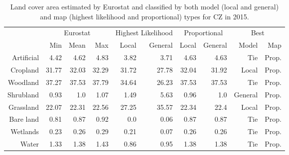     \begin{table}[H]
    \centering
    \caption{Land cover area estimated by Eurostat and classified by both model (local and general) and map (highest likelihood and proportional) types for CZ in 2015.}
    
    \begin{tabular}{r|rrr|rr|rr|rr}
    \toprule
    {} & \multicolumn{3}{|c}{Eurostat} & \multicolumn{2}{|c}{Highest Likelihood} & \multicolumn{2}{|c}{Proportional} & \multicolumn{2}{|c}{Best} \\
    {} &      Min &   Mean &    Max &              Local & General &        Local & General &    Model &    Map \\
    \midrule
    Artificial &     4.42 &   4.62 &   4.83 &               3.82 &    3.71 &         4.63 &    4.63 &      Tie &  Prop. \\
    Cropland   &    31.77 &  32.03 &  32.29 &              31.72 &   27.78 &        32.04 &   31.92 &    Local &  Prop. \\
    Woodland   &    37.27 &  37.53 &  37.79 &              34.64 &   26.23 &        37.53 &   37.53 &      Tie &  Prop. \\
    Shrubland  &     0.93 &    1.0 &   1.07 &               1.49 &    5.63 &         0.96 &     1.0 &  General &  Prop. \\
    Grassland  &    22.07 &  22.31 &  22.56 &              27.25 &   35.57 &        22.34 &    22.4 &    Local &  Prop. \\
    Bare land  &     0.81 &   0.87 &   0.92 &                0.0 &    0.06 &         0.87 &    0.87 &      Tie &  Prop. \\
    Wetlands   &     0.23 &   0.26 &   0.29 &               0.21 &    0.07 &         0.26 &    0.26 &      Tie &  Prop. \\
    Water      &     1.33 &   1.38 &   1.43 &               0.86 &    0.95 &         1.38 &    1.38 &      Tie &  Prop. \\
    \bottomrule
    \end{tabular}
    \end{table}
    

